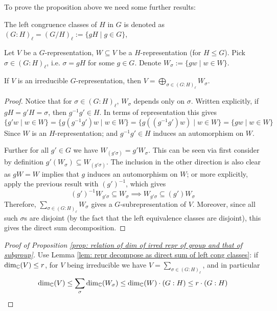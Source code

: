 \documentclass{article}
\begin{document}
\textstart
To prove the proposition above we need some further results:

\begin{notation}
    The left congruence classes of $H$ in $G$ is denoted as $(G : H)_{\ell} = (G/H)_{\ell} := \{gH \mid g \in G\}$, 
\end{notation}

\begin{lemma}\label{lem: repr decompose as direct sum of left cong classes}
    Let $V$ be a $G$-representation, $W \subseteq V$ be a $H$-representation (for $H \leq G$). Pick $\sigma \in (G : H)_{\ell}$, i.e. $\sigma = gH$ for some $g \in G$. Denote $W_{\sigma} := \{ gw \mid w \in W \}$.

    If $V$ is an irreducible $G$-representation, then $V = \bigoplus_{\sigma \in (G : H)_{\ell}} W_{\sigma}$.
\end{lemma}

\begin{proof}
    Notice that for $\sigma \in (G : H)_{\ell}$, $W_{\sigma}$ depends only on $\sigma$. Written explicitly, if $gH = g'H = \sigma$, then $g^{-1} g' \in H$. In terms of representation this gives
    \[
        \{ g' w \mid w \in W \} = \{ g (g^{-1} g')w \mid w \in W \} = \{ g((g^{-1} g') w) \mid w \in W \} = \{ gw \mid w \in W \}
    \]
    Since $W$ is an $H$-representation; and $g^{-1} g' \in H$ induces an automorphism on $W$.

    Further for all $g' \in G$ we have $W_{(g' \sigma)} = g' W_{\sigma}$. This can be seen via first consider by definition $g'(W_{\sigma}) \subseteq W_{(g' \sigma)}$. The inclusion in the other direction is also clear as $gW = W$ implies that $g$ induces an automorphism on $W$; or more explicitly, apply the previous result with $(g')^{-1}$, which gives
    \[
        (g')^{-1} W_{g' \sigma} \subseteq W_{\sigma} \implies W_{g' \sigma} \subseteq (g') W_{\sigma}
    \]
    Therefore, $\sum_{\sigma \in (G : H)_{\ell}} W_{\sigma}$ gives a $G$-subrepresentation of $V$. Moreover, since all such $\sigma$s are disjoint (by the fact that the left equivalence classes are disjoint), this gives the direct sum decomposition.
\end{proof}

\begin{proof}[Proof of Proposition \ref{prop: relation of dim of irred repr of group and that of subgroup}]
    Use Lemma \ref{lem: repr decompose as direct sum of left cong classes}: if $\dim_{\mathbb{C}}(V) \leq r$, for $V$ being irreducible we have $V = \sum_{\sigma \in (G : H)_{\ell}}$, and in particular
    \[
        \dim_{\mathbb{C}}(V) \leq \sum_{\sigma} \dim_{\mathbb{C}}(W_{\sigma}) \leq \dim_{\mathbb{C}}(W) \cdot (G : H) \leq r \cdot (G : H)
    \]
\end{proof}
\end{document}
